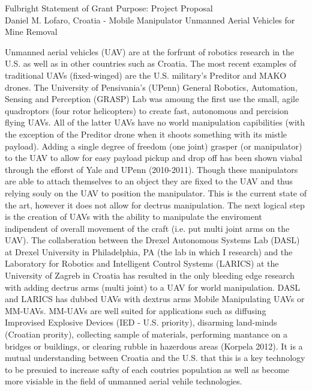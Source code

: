 \documentclass[12pt]{article}
\begin{document}
\begin{center}
Fulbright Statement of Grant Purpose: Project Proposal\\
Daniel M. Lofaro, Croatia - 
Mobile Manipulator Unmanned Aerial Vehicles for Mine Removal\\

\end{center}

Unmanned aerial vehicles (UAV) are at the forfrunt of robotics research in the U.S. as well as in other countries such as Croatia.  
The most recent examples of traditional UAVs (fixed-winged) are the U.S. military's Preditor and MAKO drones.  
The University of Pensivania's (UPenn) General Robotics, Automation, Sensing and Perception (GRASP) Lab was amoung the first use the small, agile quadroptors (four rotor helicopters) to create fast, autonomous and percision flying UAVs.  
All of the latter UAVs have no world manipulation capibilities (with the exception  of the Preditor drone when it shoots something with its mistle payload).  
Adding a single degree of freedom (one joint) grasper (or manipulator) to the UAV to allow for easy payload pickup and drop off has been shown viabal through the efforst of Yale and UPenn (2010-2011). 
Though these manipulators are able to attach themselves to an object they are fixed to the UAV and thus relying souly on the UAV to position the manipulator.  
This is the current state of the art, however it does not allow for dectrus manipulation.  
The next logical step is the creation of UAVs with the ability to manipulate the enviroment indipendent of overall movement of the craft (i.e. put multi joint arms on the UAV).  
The collaberation between the Drexel Autonomous Systems Lab (DASL) at Drexel University in Philadelphia, PA (the lab in which I research) and the Laboratory for Robotics and Intelligent Control Systems (LARICS) at the University of Zagreb in Croatia has resulted in the only bleeding edge research with adding dectrus arms (multi joint) to a UAV for world manipulation.  DASL and LARICS has dubbed UAVs with dextrus arms Mobile Manipulating UAVs or MM-UAVs. 
MM-UAVs are well suited for applications such as diffusing Improvised Explosive Devices (IED - U.S. priority), disarming land-minds (Croatian prority), collecting sample of materials, performing mantance on a bridges or buildings, or clearing rubble in hazerdous areas (Korpela 2012).  
It is a mutual understanding between Croatia and the U.S. that this is a key technology to be presuied to increase safty of each coutries population as well as become more visiable in the field of unmanned aerial vehile technologies.
\end{document}
